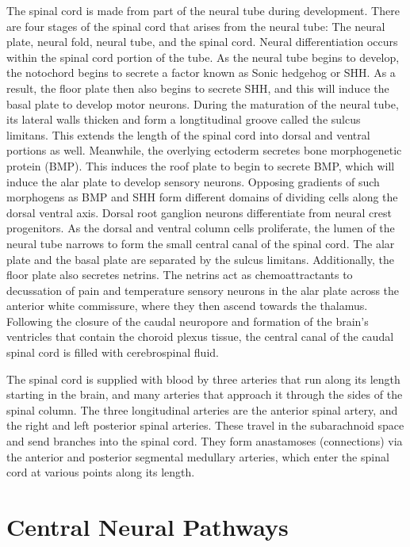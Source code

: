 The spinal cord is made from part of the neural tube during development. There are four stages of the spinal cord that arises from the neural tube: The neural plate, neural fold, neural tube, and the spinal cord. Neural differentiation occurs within the spinal cord portion of the tube. As the neural tube begins to develop, the notochord begins to secrete a factor known as Sonic hedgehog or SHH. As a result, the floor plate then also begins to secrete SHH, and this will induce the basal plate to develop motor neurons. During the maturation of the neural tube, its lateral walls thicken and form a longtitudinal groove called the sulcus limitans. This extends the length of the spinal cord into dorsal and ventral portions as well. Meanwhile, the overlying ectoderm secretes bone morphogenetic protein (BMP). This induces the roof plate to begin to secrete BMP, which will induce the alar plate to develop sensory neurons. Opposing gradients of such morphogens as BMP and SHH form different domains of dividing cells along the dorsal ventral axis. Dorsal root ganglion neurons differentiate from neural crest progenitors. As the dorsal and ventral column cells proliferate, the lumen of the neural tube narrows to form the small central canal of the spinal cord. The alar plate and the basal plate are separated by the sulcus limitans. Additionally, the floor plate also secretes netrins. The netrins act as chemoattractants to decussation of pain and temperature sensory neurons in the alar plate across the anterior white commissure, where they then ascend towards the thalamus. Following the closure of the caudal neuropore and formation of the brain's ventricles that contain the choroid plexus tissue, the central canal of the caudal spinal cord is filled with cerebrospinal fluid.

The spinal cord is supplied with blood by three arteries that run along its length starting in the brain, and many arteries that approach it through the sides of the spinal column. The three longitudinal arteries are the anterior spinal artery, and the right and left posterior spinal arteries. These travel in the subarachnoid space and send branches into the spinal cord. They form anastamoses (connections) via the anterior and posterior segmental medullary arteries, which enter the spinal cord at various points along its length.

\hypertarget{central-neural-pathways}{%
\section{Central Neural Pathways}\label{central-neural-pathways}}

